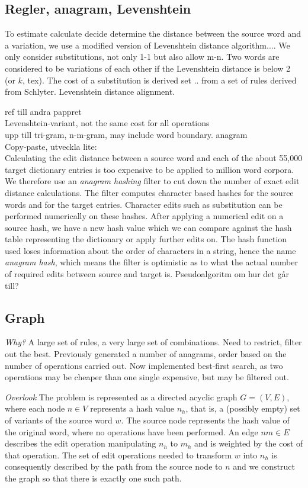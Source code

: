 \documentclass[10pt,a5paper,twoside]{article}
\begin{document}
\subsection{Regler, anagram, Levenshtein}
To estimate calculate decide determine the distance between the source word
and a variation, we use a modified version of Levenshtein distance algorithm....
We only consider substitutions, not only 1-1 but also allow m-n.
Two words are considered to be variations of each other if the Levenshtein distance
is below 2 (or $k$, tex).
The cost of a substitution is derived set .. from a set of rules derived from Schlyter.
Levenshtein distance alignment.

ref till andra pappret\\

Levenshtein-variant, not the same cost for all operations\\
upp till tri-gram, n-m-gram, may include word boundary.
anagram\\
Copy-paste, utveckla lite:\\
Calculating the edit distance between a source word and each of the
about 55,000 target dictionary entries is too expensive
to be applied to million word corpora. We therefore
use an \textit{anagram hashing} filter \cite{Reynaert2010} to
cut down the number of exact edit distance calculations.  The filter
computes character based hashes for the source words and for the target
entries. Character edits such as substitution can be performed
numerically on these hashes. After applying a numerical edit on a
source hash, we have a new hash value which we can compare against the
hash table representing the dictionary or apply further edits on. The
hash function used loses information about the order of characters in
a string, hence the name \textit{anagram hash}, which means the filter
is optimistic as to what the actual number of required edits between
source and target is.
Pseudoalgoritm om hur det går till?

\subsection{Graph}
\textit{Why?}
A large set of rules, a very large set of combinations. Need to restrict, filter
out the best. Previously generated a number of anagrams, order based on the number of
operations carried out. Now implemented best-first search, as two operations may
be cheaper than one single expensive, but may be filtered out.

\textit{Overlook}
The problem is represented as a directed acyclic graph $G = (V,E)$, where each
node $n \in V$ represents a hash value $n_h$, that is, a (possibly empty) set
of variants of the source word $w$.
The source node represents the hash value of the original word, where no
operations have been performed.
An edge $nm \in E$ describes the edit operation manipulating $n_h$ to $m_h$
and is weighted by the cost of that operation.
The set of edit operations needed to transform $w$ into $n_h$ is consequently %
described by the path from the source node to $n$ and we construct the
graph so that there is exactly one such path.
\end{document}

